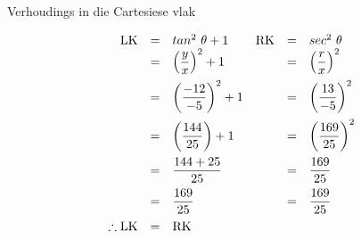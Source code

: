 \begin{wex}{Verhoudings in die Cartesiese vlak}
{
\begin{equation*}
\begin{array}{rclrcl}
 \hfill \mbox{LK} &=&  tan^{2}~\theta + 1 	&	\mbox{RK}	&=&  	sec^{2}~\theta \hfill \\
\hfill &=& \left(\dfrac{y}{x}\right)^{2} + 1  	&	&=&  \left(\dfrac{r}{x}\right)^{2} \hfill \vspace{5pt} \\
\hfill&=&  \left(\dfrac{-12}{-5}\right)^{2} + 1 	&	&=&  \left(\dfrac{13}{-5}\right)^{2} \hfill \vspace{5pt}\\
\hfill&=&  \left (\dfrac{144}{25}\right) + 1  	&	&=&  \left(\dfrac{169}{25}\right)^{2} \hfill \vspace{5pt}\\
\hfill &=& \dfrac{144 + 25}{25} 		&	&=&  \dfrac{169}{25} \hfill \vspace{5pt}\\
\hfill &=& \dfrac{169}{25}  			&	&=&  \dfrac{169}{25} \hfill \vspace{5pt}\\
\hfill \therefore \mbox{LK} &=& \mbox{RK}&& \hfill

\end{array}
\end{equation*}

}
\end{wex}


